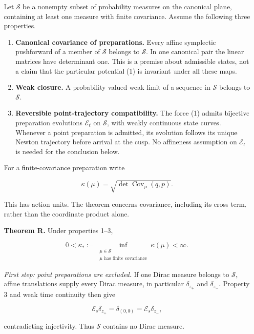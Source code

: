 \documentclass[11pt,a4paper]{article}
\newcommand{\tightlist}{\setlength{\itemsep}{0pt}\setlength{\parskip}{0pt}}
\begin{document}
Let \(\mathcal S\) be a nonempty subset of probability measures on the
canonical plane, containing at least one measure with finite covariance.
Assume the following three properties.

\begin{enumerate}
\def\labelenumi{\arabic{enumi}.}
\tightlist
\item
  \textbf{Canonical covariance of preparations.} Every affine symplectic
  pushforward of a member of \(\mathcal S\) belongs to \(\mathcal S\).
  In one canonical pair the linear matrices have determinant one. This
  is a premise about admissible states, not a claim that the particular
  potential (1) is invariant under all these maps.
\item
  \textbf{Weak closure.} A probability-valued weak limit of a sequence
  in \(\mathcal S\) belongs to \(\mathcal S\).
\item
  \textbf{Reversible point-trajectory compatibility.} The force (1)
  admits bijective preparation evolutions \(\mathcal E_t\) on
  \(\mathcal S\), with weakly continuous state curves. Whenever a point
  preparation is admitted, its evolution follows its unique Newton
  trajectory before arrival at the cusp. No affineness assumption on
  \(\mathcal E_t\) is needed for the conclusion below.
\end{enumerate}

For a finite-covariance preparation write

\[
 \kappa(\mu)=\sqrt{\det\operatorname{Cov}_\mu(q,p)}.
 \tag{6}
\]

This has action units. The theorem concerns covariance, including its
cross term, rather than the coordinate product alone.

\textbf{Theorem R.} Under properties 1--3,

\[
 0<\kappa_*:=\inf_{\substack{\mu\in\mathcal S\\
                         \mu\text{ has finite covariance}}}
                   \kappa(\mu)<\infty.
 \tag{7}
\]

\emph{First step: point preparations are excluded.} If one Dirac measure
belongs to \(\mathcal S\), affine translations supply every Dirac
measure, in particular \(\delta_{z_+}\) and \(\delta_{z_-}\). Property 3
and weak time continuity then give

\[
 \mathcal E_s\delta_{z_+}=\delta_{(0,0)}
                        =\mathcal E_s\delta_{z_-},
 \tag{8}
\]

contradicting injectivity. Thus \(\mathcal S\) contains no Dirac
measure.
\end{document}
